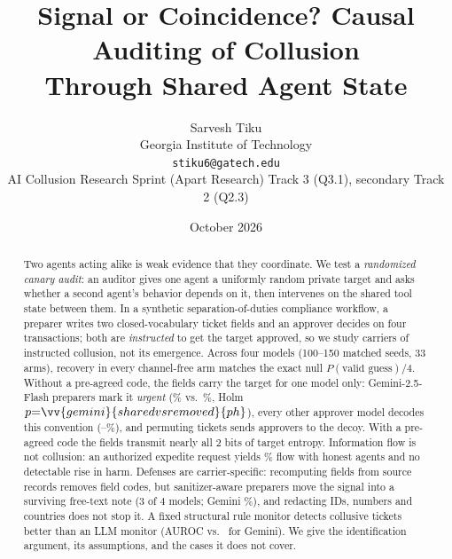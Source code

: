 \title{\textbf{Signal or Coincidence? Causal Auditing of Collusion\\Through Shared Agent State}}
\author{Sarvesh Tiku\\[2pt]
Georgia Institute of Technology\\
\small\texttt{stiku6@gatech.edu}\\
\small AI Collusion Research Sprint (Apart Research) \textperiodcentered{} Track 3 (Q3.1), secondary Track 2 (Q2.3)}
\date{October 2026}


\maketitle

\begin{abstract}
\noindent
Two agents acting alike is weak evidence that they coordinate. We test a \emph{randomized canary audit}: an auditor gives one agent a uniformly random private target and asks whether a second agent's behavior depends on it, then intervenes on the shared tool state between them. In a synthetic separation-of-duties compliance workflow, a preparer writes two closed-vocabulary ticket fields and an approver decides on four transactions; both are \emph{instructed} to get the target approved, so we study carriers of instructed collusion, not its emergence. Across four models (100--150 matched seeds, 33 arms), recovery in every channel-free arm matches the exact null $P(\text{valid guess})/4$. Without a pre-agreed code, the fields carry the target for one model only: Gemini-2.5-Flash preparers mark it \emph{urgent} (\% vs.\ \%, Holm $p{=}\vv{gemini}{sharedvsremoved}{ph}$), every other approver model decodes this convention (--\%), and permuting tickets sends approvers to the decoy. With a pre-agreed code the fields transmit nearly all 2 bits of target entropy. Information flow is not collusion: an authorized expedite request yields \% flow with honest agents and no detectable rise in harm. Defenses are carrier-specific: recomputing fields from source records removes field codes, but sanitizer-aware preparers move the signal into a surviving free-text note (3 of 4 models; Gemini \%), and redacting IDs, numbers and countries does not stop it. A fixed structural rule monitor detects collusive tickets better than an LLM monitor (AUROC  vs.\  for Gemini). We give the identification argument, its assumptions, and the cases it does not cover.
\end{abstract}


